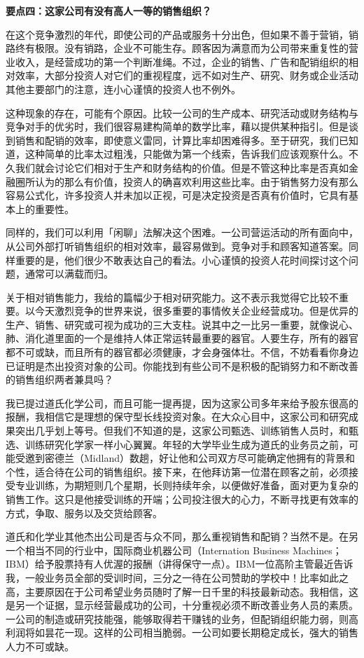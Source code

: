 \documentclass[UTF8,a4paper,zihao=-4,fontset = windows]{ctexart} %
\begin{document}
\textbf{要点四：这家公司有没有高人一等的销售组织？}


在这个竞争激烈的年代，即使公司的产品或服务十分出色，但如果不善于营销，销路终有极限。没有销路，企业不可能生存。顾客因为满意而为公司带来重复性的营业收入，是经营成功的第一个判断准绳。不过，企业的销售、广告和配销组织的相对效率，大部分投资人对它们的重视程度，远不如对生产、研究、财务或企业活动其他主要部门的注意，连小心谨慎的投资人也不例外。

这种现象的存在，可能有个原因。比较一公司的生产成本、研究活动或财务结构与竞争对手的优劣时，我们很容易建构简单的数学比率，藉以提供某种指引。但是谈到销售和配销的效率，即使意义雷同，计算比率却困难得多。至于研究，我们已知道，这种简单的比率太过粗浅，只能做为第一个线索，告诉我们应该观察什么。不久我们就会讨论它们相对于生产和财务结构的价值。但是不管这种比率是否真如金融圈所认为的那么有价值，投资人的确喜欢利用这些比率。由于销售努力没有那么容易公式化，许多投资人并未加以正视，可是决定投资是否真有价值时，它具有基本上的重要性。

同样的，我们可以利用「闲聊」法解决这个困难。一公司营运活动的所有面向中，从公司外部打听销售组织的相对效率，最容易做到。竞争对手和顾客知道答案。同样重要的是，他们很少不敢表达自己的看法。小心谨慎的投资人花时间探讨这个问题，通常可以满载而归。

关于相对销售能力，我给的篇幅少于相对研究能力。这不表示我觉得它比较不重要。以今天激烈竞争的世界来说，很多重要的事情攸关企业经营成功。但是优异的生产、销售、研究或可视为成功的三大支柱。说其中之一比另一重要，就像说心、肺、消化道里面的一个是维持人体正常运转最重要的器官。人要生存，所有的器官都不可或缺，而且所有的器官都必须健康，才会身强体壮。不信，不妨看看你身边已证明是杰出投资对象的公司。你能找到有些公司不是积极的配销努力和不断改善的销售组织两者兼具吗？

我已提过道氏化学公司，而且可能一提再提，因为这家公司多年来给予股东很高的报酬，我相信它是理想的保守型长线投资对象。在大众心目中，这家公司和研究成果突出几乎划上等号。但我们不知道的是，这家公司甄选、训练销售人员时，和甄选、训练研究化学家一样小心翼翼。年轻的大学毕业生成为道氏的业务员之前，可能受邀到密德兰（Midland）数趟，好让他和公司双方尽可能确定他拥有的背景和个性，适合待在公司的销售组织。接下来，在他拜访第一位潜在顾客之前，必须接受专业训练，为期短则几个星期，长则持续年余，以便做好准备，面对更为复杂的销售工作。这只是他接受训练的开端；公司投注很大的心力，不断寻找更有效率的方式，争取、服务以及交货给顾客。

道氏和化学业其他杰出公司是否与众不同，那么重视销售和配销？当然不是。在另一个相当不同的行业中，国际商业机器公司（Internation Business Machines；IBM）给予股票持有人优渥的报酬（讲得保守一点）。IBM一位高阶主管最近告诉我，一般业务员全部的受训时间，三分之一待在公司赞助的学校中！比率如此之高，主要原因在于公司希望业务员随时了解一日千里的科技最新动态。我相信，这是另一个证据，显示经营最成功的公司，十分重视必须不断改善业务人员的素质。一公司的制造或研究技能强，能够取得若干赚钱的业务，但配销组织能力弱，则高利润将如昙花一现。这样的公司相当脆弱。一公司如要长期稳定成长，强大的销售人力不可或缺。
\\
\end{document}
